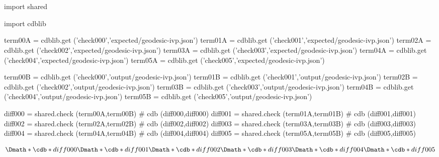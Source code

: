 \documentclass[12pt]{cdblatex}
\begin{document}
\section*{\jobname}


\begin{cadabra}
   import shared

   import cdblib

   term00A = cdblib.get ('check000','expected/geodesic-ivp.json')
   term01A = cdblib.get ('check001','expected/geodesic-ivp.json')
   term02A = cdblib.get ('check002','expected/geodesic-ivp.json')
   term03A = cdblib.get ('check003','expected/geodesic-ivp.json')
   term04A = cdblib.get ('check004','expected/geodesic-ivp.json')
   term05A = cdblib.get ('check005','expected/geodesic-ivp.json')

   term00B = cdblib.get ('check000','output/geodesic-ivp.json')
   term01B = cdblib.get ('check001','output/geodesic-ivp.json')
   term02B = cdblib.get ('check002','output/geodesic-ivp.json')
   term03B = cdblib.get ('check003','output/geodesic-ivp.json')
   term04B = cdblib.get ('check004','output/geodesic-ivp.json')
   term05B = cdblib.get ('check005','output/geodesic-ivp.json')

   diff000 = shared.check (term00A,term00B)   # cdb (diff000,diff000)
   diff001 = shared.check (term01A,term01B)   # cdb (diff001,diff001)
   diff002 = shared.check (term02A,term02B)   # cdb (diff002,diff002)
   diff003 = shared.check (term03A,term03B)   # cdb (diff003,diff003)
   diff004 = shared.check (term04A,term04B)   # cdb (diff004,diff004)
   diff005 = shared.check (term05A,term05B)   # cdb (diff005,diff005)

\end{cadabra}

\begin{dgroup*}
   \Dmath*{ \cdb*{diff000} }
   \Dmath*{ \cdb*{diff001} }
   \Dmath*{ \cdb*{diff002} }
   \Dmath*{ \cdb*{diff003} }
   \Dmath*{ \cdb*{diff004} }
   \Dmath*{ \cdb*{diff005} }
\end{dgroup*}
\end{document}
